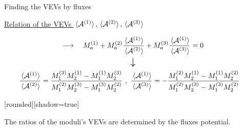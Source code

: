 \documentclass[
  unicode,a4paper,10pt,
  xcolor = {dvipsnames,svgnames},
  hyperref ={colorlinks=true,citecolor=Navy,linkcolor=NavyBlue,urlcolor=purple},
  ja=standard,lualatex
]{beamer}
\begin{document}
\begin{frame}{Finding the VEVs by fluxes}

  \uline{Relation of the VEVs $\ev*{\mathcal{A}^{(1)}},\ev*{\mathcal{A}^{(2)}},\ev*{\mathcal{A}^{(3)}}$}

  \begin{center}
  \end{center}

  \pause

  \vspace*{-20pt}

  \begin{gather}
    \longrightarrow\quad
    M_{a}^{(1)}
    +
    M_{a}^{(2)}
    \frac{\ev*{\mathcal{A}^{(1)}}}{\ev*{\mathcal{A}^{(2)}}}
    +
    M_{a}^{(3)}
    \frac{\ev*{\mathcal{A}^{(1)}}}{\ev*{\mathcal{A}^{(3)}}}
    =
    0
    \nonumber
    \\
    \text{\Large $\downarrow$}
    \nonumber
    \\
    \hspace*{-10pt}
    \frac{\ev*{\mathcal{A}^{(1)}}}{\ev*{\mathcal{A}^{(2)}}}
    =
    \frac{
    M_{1}^{(3)} M_{2}^{(1)}-M_{1}^{(1)} M_{2}^{(3)}
    }{
    M_{1}^{(2)} M_{2}^{(3)}- M_{1}^{(3)} M_{2}^{(2)}
    }
    \ ,\
    \frac{\ev*{\mathcal{A}^{(1)}}}{\ev*{\mathcal{A}^{(3)}}}
    =
    -\frac{
    M_{1}^{(2)} M_{2}^{(1)}-M_{1}^{(1)} M_{2}^{(2)}
    }{
    M_{1}^{(2)} M_{2}^{(3)}-M_{1}^{(3)} M_{2}^{(2)}
    }
    \nonumber
  \end{gather}

  \pause

  [rounded][shadow=true]

  \begin{block}{}
    \centering
    The ratios of the moduli's VEVs are determined by the fluxes potential.
  \end{block}

\end{frame}
\end{document}
